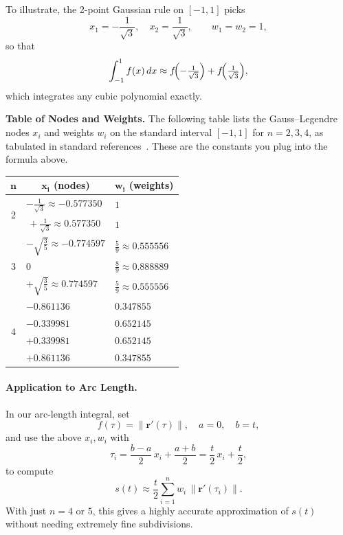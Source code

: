 \documentclass[11pt]{article}
\begin{document}
To illustrate, the 2-point Gaussian rule on \([-1,1]\) picks
\[
x_1=-\frac{1}{\sqrt{3}},\quad x_2=\frac{1}{\sqrt{3}},
\qquad
w_1=w_2=1,
\]
so that
\[
\int_{-1}^{1} f(x)\,dx \approx f\!\Bigl(-\tfrac{1}{\sqrt{3}}\Bigr)
             +f\!\Bigl(\tfrac{1}{\sqrt{3}}\Bigr),
\]
which integrates any cubic polynomial exactly.

\bigskip
\noindent\textbf{Table of Nodes and Weights.}%
\quad The following table lists the Gauss–Legendre nodes \(x_i\) and weights \(w_i\) on the standard interval \([-1,1]\) for \(n=2,3,4\), as tabulated in standard references~\cite{gauss}. These are the constants you plug into the formula above.

\begin{center}
\begin{tabular}{cll}
\toprule
\multicolumn{1}{c}{\(\boldsymbol{n}\)} & \multicolumn{1}{c}{\(\boldsymbol{x_i}\) (nodes)} 
                                       & \multicolumn{1}{c}{\(\boldsymbol{w_i}\) (weights)} \\
\midrule
\multirow{2}{*}{2} & \(-\tfrac{1}{\sqrt{3}}\approx -0.577350\) & \(1\) \\
                   & \(\,+\tfrac{1}{\sqrt{3}}\approx  0.577350\) & \(1\) \\
\midrule
\multirow{3}{*}{3} & \(-\sqrt{\tfrac{3}{5}}\approx -0.774597\)  & \(\tfrac{5}{9}\approx0.555556\) \\
                   & \(0\)                                       & \(\tfrac{8}{9}\approx0.888889\) \\
                   & \(+\sqrt{\tfrac{3}{5}}\approx  0.774597\)  & \(\tfrac{5}{9}\approx0.555556\) \\
\midrule
\multirow{4}{*}{4} & \(-0.861136\) & \(0.347855\) \\
                   & \(-0.339981\) & \(0.652145\) \\
                   & \(+0.339981\) & \(0.652145\) \\
                   & \(+0.861136\) & \(0.347855\) \\
\bottomrule
\end{tabular}
\end{center}

\paragraph{Application to Arc Length.}%
In our arc-length integral, set 
\[
f(\tau)=\|\mathbf r'(\tau)\|,
\quad
a=0,\quad b=t,
\]
and use the above \(x_i,w_i\) with
\[
\tau_i = \frac{b-a}{2}\,x_i + \frac{a+b}{2}
         = \frac{t}{2}\,x_i + \frac{t}{2},
\]
to compute
\[
s(t) \approx \frac{t}{2}\sum_{i=1}^n w_i\,\|\mathbf r'(\tau_i)\|.
\]
With just \(n=4\) or \(5\), this gives a highly accurate approximation of \(s(t)\) without needing extremely fine subdivisions.
\end{document}
